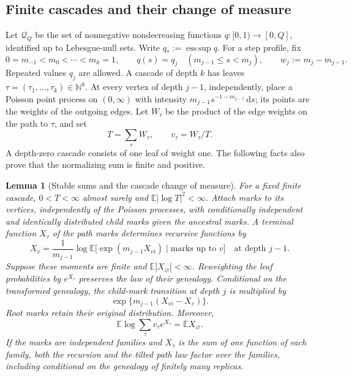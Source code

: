 \documentclass[11pt,a4paper]{article}
\numberwithin{equation}{section}
\newtheorem{lemma}[theorem]{Lemma}
\theoremstyle{definition}
\theoremstyle{remark}
\newcommand{\E}{\mathbb E}
\newcommand{\N}{\mathbb N}
\newcommand{\dd}{\mathrm d}
\DeclareMathOperator*{\esssup}{ess\,sup}
\begin{document}
\subsection{Finite cascades and their change of measure}

Let $\mathcal Q_Q$ be the set of nonnegative nondecreasing functions
$q:[0,1)\to[0,Q]$, identified up to Lebesgue-null sets.  Write
$q_*:=\esssup q$.  For a step profile, fix
\[
 0=m_{-1}<m_0<\cdots<m_k=1,\qquad
 q(s)=q_j\quad(m_{j-1}\le s<m_j),
 \qquad w_j:=m_j-m_{j-1}.
\]
Repeated values $q_j$ are allowed.  A cascade of depth $k$ has leaves
$\tau=(\tau_1,\ldots,\tau_k)\in\N^k$.  At every vertex of depth $j-1$, independently,
place a Poisson point process on $(0,\infty)$ with intensity
$m_{j-1}s^{-1-m_{j-1}}\,\dd s$; its points are the weights of the outgoing edges.
Let $W_\tau$ be the product of the edge weights on the path to $\tau$, and set
\[
 T=\sum_\tau W_\tau,\qquad v_\tau=W_\tau/T.
\]
A depth-zero cascade consists of one leaf of weight one.  The following
facts also prove that the normalizing sum is finite and positive.

\begin{lemma}[Stable sums and the cascade change of measure]
\label{lem:hier-cascade-tilt}
For a fixed finite cascade, $0<T<\infty$ almost surely and
$\E|\log T|^2<\infty$.  Attach marks to its vertices, independently of the
Poisson processes, with conditionally independent and identically distributed
child marks given the ancestral marks.  A terminal function $X_\tau$ of the
path marks determines recursive functions by
\begin{equation}
 X_v=\frac1{m_{j-1}}\log
       \E\bigl[\exp(m_{j-1}X_{vi})\mid\text{marks up to }v\bigr]
 \quad\text{at depth }j-1.
 \label{eq:hier-mark-recursion}
\end{equation}
Suppose these moments are finite and $\E|X_\varnothing|<\infty$.
Reweighting the leaf probabilities by $e^{X_\tau}$ preserves the law of their
genealogy.  Conditional on the transformed genealogy, the child-mark
transition at depth $j$ is multiplied by
\begin{equation}
 \exp\{m_{j-1}(X_{vi}-X_v)\}.
 \label{eq:hier-child-tilt}
\end{equation}
Root marks retain their original distribution.  Moreover,
\begin{equation}
 \E\log\sum_\tau v_\tau e^{X_\tau}=\E X_\varnothing.
 \label{eq:hier-root-expectation}
\end{equation}
If the marks are independent families and $X_\tau$ is the sum of one function
of each family, both the recursion and the tilted path law factor over the
families, including conditional on the genealogy of finitely many replicas.
\end{lemma}
\end{document}
